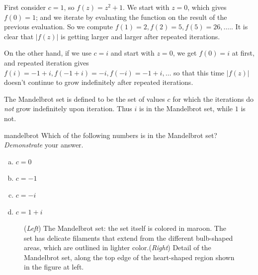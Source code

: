 First consider $c=1$, so $f(z) = z^2 + 1$. We start with $z=0$, which gives $f(0) = 1$; and we iterate by evaluating the function on the result of the previous evaluation. So we compute $f(1) = 2, f(2) = 5, f(5) = 26, \ldots.$. It is clear that $|f(z)|$ is getting larger and larger after repeated iterations. 

On the other hand, if we use $c=i$ and start with $z=0$, we get $f(0) = i$ at first, and repeated iteration gives $f(i) = -1+i, f(-1+i) =- i, f(-i) = -1 + i, \ldots$ so that this time $|f(z)|$ doesn't continue to grow indefinitely after repeated iterations. 

The Mandelbrot set is defined to be the set of values $c$ for which the iterations do \emph{not} grow indefinitely upon iteration. Thus $i$ is in the Mandelbrot set, while $1$ is not. 

\begin{exercise}{mandelbrot}
Which of the following numbers is in the Mandelbrot set? \emph{Demonstrate} your answer.
\begin{multicols}{2}
\begin{enumerate}[(a)]
\item
$c = 0$
\item
$c = -1$
\item
$c = -i$
\item
$c = 1+i$
\end{enumerate}
\end{multicols}
\end{exercise}

\begin{figure}[hbt]  
\caption{(\emph{Left}) The Mandelbrot set: the set itself is colored in maroon. The  set has delicate filaments that extend from the different bulb-shaped areas, which are outlined in lighter color.(\emph{Right}) Detail of the Mandelbrot set, along the top edge of the heart-shaped region shown in the figure at left. \label{mandelbrot}}
\end{figure}

